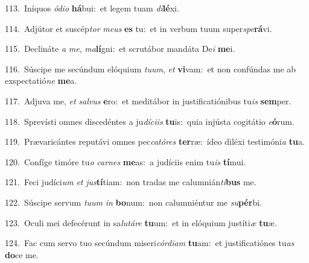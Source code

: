 {\numbfont\textcolor{\numbcolor}{113.}}~Iníquos \textit{ó}\-\textit{di}\textit{o} \textbf{há}\-bui:~\star et legem tuam \textit{di}\-\textbf{lé}xi.\par
{\numbfont\textcolor{\numbcolor}{114.}}~Adjútor et suscép\textit{tor} \textit{me}\-\textit{us} \textbf{es} tu:~\star et in verbum tuum super\-\textit{spe}\-\textbf{rá}vi.\par
{\numbfont\textcolor{\numbcolor}{115.}}~Declináte \textit{a} \textit{me}\-, \textit{ma}\-\textbf{lí}gni:~\star et scrutábor mandáta De\textit{i} \textbf{me}\-i.\par
{\numbfont\textcolor{\numbcolor}{116.}}~Súscipe me secúndum elóquium \textit{tu}\-\textit{um}, \textit{et} \textbf{vi}\-vam:~\star et non confúndas me ab exspectatió\textit{ne} \textbf{me}\-a.\par
{\numbfont\textcolor{\numbcolor}{117.}}~Adjuva me, \textit{et} \textit{sal}\-\textit{vus} \textbf{e}\-ro:~\star et meditábor in justificatiónibus tu\textit{is} \textbf{sem}\-per.\par
{\numbfont\textcolor{\numbcolor}{118.}}~Sprevísti omnes discedéntes a ju\-\textit{dí}\-\textit{ci}\textit{is} \textbf{tu}\-is:~\star quia injústa cogitátio \textit{e}\-\textbf{ó}rum.\par
{\numbfont\textcolor{\numbcolor}{119.}}~Prævaricántes reputávi omnes pec\-\textit{ca}\-\textit{tó}\textit{res} \textbf{ter}\-ræ:~\star ídeo diléxi testimóni\textit{a} \textbf{tu}\-a.\par
{\numbfont\textcolor{\numbcolor}{120.}}~Confíge timóre tu\textit{o} \textit{car}\-\textit{nes} \textbf{me}\-as:~\star a judíciis enim tu\textit{is} \textbf{tí}\-mui.\par
{\numbfont\textcolor{\numbcolor}{121.}}~Feci judíci\textit{um} \textit{et} \textit{jus}\-\textbf{tí}tiam:~\star non tradas me calumnián\-\textit{ti}\-\textbf{bus} me.\par
{\numbfont\textcolor{\numbcolor}{122.}}~Súscipe servum \textit{tu}\-\textit{um} \textit{in} \textbf{bo}\-num:~\star non calumniéntur me \textit{su}\-\textbf{pér}bi.\par
{\numbfont\textcolor{\numbcolor}{123.}}~Oculi mei defecérunt in sa\-\textit{lu}\-\textit{tá}\textit{re} \textbf{tu}\-um:~\star et in elóquium justíti\textit{æ} \textbf{tu}\-æ.\par
{\numbfont\textcolor{\numbcolor}{124.}}~Fac cum servo tuo secúndum miseri\-\textit{cór}\-\textit{di}\textit{am} \textbf{tu}\-am:~\star et justificatiónes tu\textit{as} \textbf{do}\-ce me.\par
